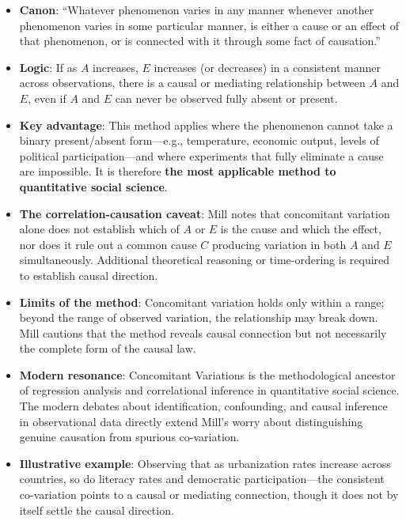 \documentclass[12pt]{article}
\begin{document}
\begin{itemize}[leftmargin=*, itemsep=4pt]
    \item \textbf{Canon}: ``Whatever phenomenon varies in any manner whenever another phenomenon varies in some particular manner, is either a cause or an effect of that phenomenon, or is connected with it through some fact of causation.''
    \item \textbf{Logic}: If as $A$ increases, $E$ increases (or decreases) in a consistent manner across observations, there is a causal or mediating relationship between $A$ and $E$, even if $A$ and $E$ can never be observed fully absent or present.
    \item \textbf{Key advantage}: This method applies where the phenomenon cannot take a binary present/absent form---e.g., temperature, economic output, levels of political participation---and where experiments that fully eliminate a cause are impossible. It is therefore \textbf{the most applicable method to quantitative social science}.
    \item \textbf{The correlation-causation caveat}: Mill notes that concomitant variation alone does not establish which of $A$ or $E$ is the cause and which the effect, nor does it rule out a common cause $C$ producing variation in both $A$ and $E$ simultaneously. Additional theoretical reasoning or time-ordering is required to establish causal direction.
    \item \textbf{Limits of the method}: Concomitant variation holds only within a range; beyond the range of observed variation, the relationship may break down. Mill cautions that the method reveals causal connection but not necessarily the complete form of the causal law.
    \item \textbf{Modern resonance}: Concomitant Variations is the methodological ancestor of regression analysis and correlational inference in quantitative social science. The modern debates about identification, confounding, and causal inference in observational data directly extend Mill's worry about distinguishing genuine causation from spurious co-variation.
    \item \textbf{Illustrative example}: Observing that as urbanization rates increase across countries, so do literacy rates and democratic participation---the consistent co-variation points to a causal or mediating connection, though it does not by itself settle the causal direction.
\end{itemize}

\end{document}
